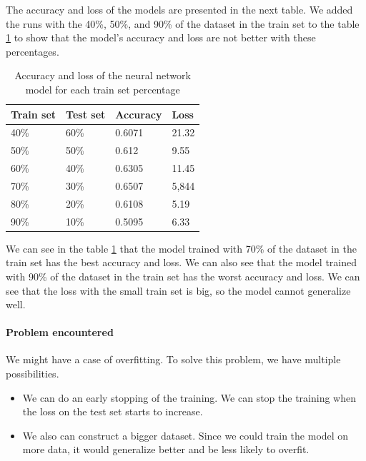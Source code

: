 The accuracy and loss of the models are presented in the next table. We added the runs with the 40\%, 50\%, and 90\% of the dataset in the train set to the table \ref{tab:neural_network_results} to show that the model's accuracy and loss are not better with these percentages.

\begin{table}[H]
    \centering
    \begin{tabular}{|l|l|l|l|}
    \hline
    \textbf{Train set} & \textbf{Test set} & \textbf{Accuracy} & \textbf{Loss} \\ \hline
    40\%               & 60\%              & 0.6071              & 21.32         \\ \hline
    50\%               & 50\%              & 0.612               & 9.55          \\ \hline
    60\%               & 40\%              & 0.6305              & 11.45         \\ \hline
    70\%               & 30\%              & 0.6507              & 5,844         \\ \hline
    80\%               & 20\%              & 0.6108              & 5.19          \\ \hline
    90\%               & 10\%              & 0.5095              & 6.33          \\ \hline
    \end{tabular}
    \caption{Accuracy and loss of the neural network model for each train set percentage}
    \label{tab:neural_network_results}
\end{table}

We can see in the table \ref{tab:neural_network_results} that the model trained with 70\% of the dataset in the train set has the best accuracy and loss. We can also see that the model trained with 90\% of the dataset in the train set has the worst accuracy and loss. We can see that the loss with the small train set is big, so the model cannot generalize well.

\paragraph{Problem encountered}

We might have a case of overfitting. To solve this problem, we have multiple possibilities.

\begin{itemize}
    \item We can do an early stopping of the training. We can stop the training when the loss on the test set starts to increase. 
    \item We also can construct a bigger dataset. Since we could train the model on more data, it would generalize better and be less likely to overfit.
\end{itemize}

